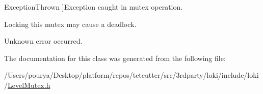 \begin{Desc}
\begin{description}
{\hypertarget{classLoki_1_1MutexErrors_acd0eb6065ca303083d2e0229d7bff590a86ee8c02305dbc02a61070e9912bee22}{}Exception\+Thrown\label{classLoki_1_1MutexErrors_acd0eb6065ca303083d2e0229d7bff590a86ee8c02305dbc02a61070e9912bee22}
}]Exception caught in mutex operation. \item[{\em 
\hypertarget{classLoki_1_1MutexErrors_acd0eb6065ca303083d2e0229d7bff590a7b3cc9a416dfa15b7877e978a1ca4aee}{}May\+Deadlock\label{classLoki_1_1MutexErrors_acd0eb6065ca303083d2e0229d7bff590a7b3cc9a416dfa15b7877e978a1ca4aee}
}]Locking this mutex may cause a deadlock. \item[{\em 
\hypertarget{classLoki_1_1MutexErrors_acd0eb6065ca303083d2e0229d7bff590a7160943d5a3247df7515bd4005ce2d62}{}Other\+Error\label{classLoki_1_1MutexErrors_acd0eb6065ca303083d2e0229d7bff590a7160943d5a3247df7515bd4005ce2d62}
}]Unknown error occurred. \end{description}
\end{Desc}


The documentation for this class was generated from the following file\+:\begin{DoxyCompactItemize}
\item 
/\+Users/pourya/\+Desktop/platform/repos/tetcutter/src/3rdparty/loki/include/loki/\hyperlink{LevelMutex_8h}{Level\+Mutex.\+h}\end{DoxyCompactItemize}
